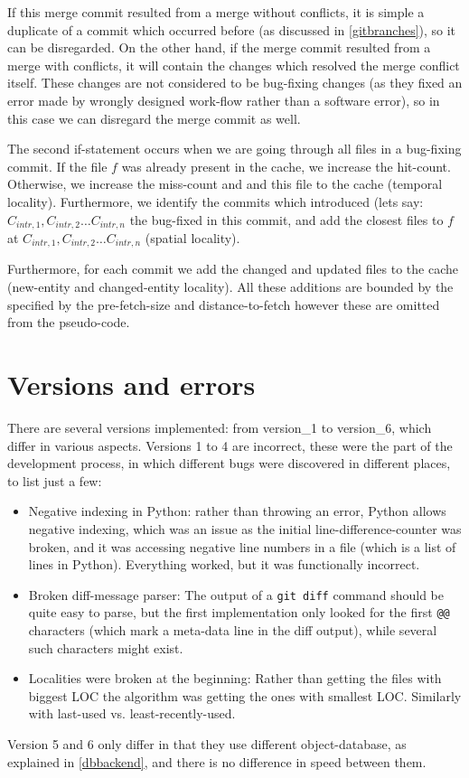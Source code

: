 \documentclass[12pt,twoside,notitlepage]{report}
\begin{document}
If this merge commit resulted from a merge without conflicts, it is simple a duplicate of a commit which occurred before (as discussed in \ref{gitbranches}), so it can be disregarded. On the other hand, if the merge commit resulted from a merge with conflicts, it will contain the changes which resolved the merge conflict itself. These changes are not considered to be bug-fixing changes (as they fixed an error made by wrongly designed work-flow rather than a software error), so in this case we can disregard the merge commit as well.

The second if-statement occurs when we are going through all files in a bug-fixing commit. If the file $f$ was already present in the cache, we increase the hit-count. Otherwise, we increase the miss-count and and this file to the cache (temporal locality). Furthermore, we identify the commits which introduced (lets say: $C_{intr,1}, C_{intr,2} \dots C_{intr,n}$ the bug-fixed in this commit, and add the closest files to $f$ at $C_{intr,1}, C_{intr,2} \dots C_{intr,n}$ (spatial locality).

Furthermore, for each commit we add the changed and updated files to the cache (new-entity and changed-entity locality). All these additions are bounded by the specified by the pre-fetch-size and distance-to-fetch however these are omitted from the pseudo-code.
\section{Versions and errors}
There are several versions implemented: from version\_1 to version\_6, which differ in various aspects. Versions 1 to 4 are incorrect, these were the part of the development process, in which different bugs were discovered in different places, to list just a few:
\begin{itemize}
\item Negative indexing in Python: rather than throwing an error, Python allows negative indexing, which was an issue as the initial line-difference-counter was broken, and it was accessing negative line numbers in a file (which is a list of lines in Python). Everything worked, but it was functionally incorrect.
\item Broken diff-message parser: The output of a \texttt{git diff} command should be quite easy to parse, but the first implementation only looked for the first \texttt{@@} characters (which mark a meta-data line in the diff output), while several such characters might exist.
\item Localities were broken at the beginning: Rather than getting the files with biggest LOC the algorithm was getting the ones with smallest LOC. Similarly with last-used vs. least-recently-used.
\end{itemize}
Version 5 and 6 only differ in that they use different object-database, as explained in \ref{dbbackend}, and there is no difference in speed between them.
\end{document}
